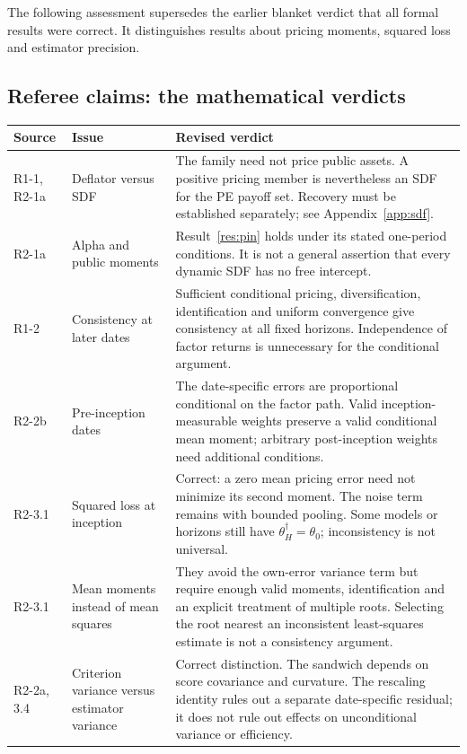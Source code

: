 \documentclass[11pt]{article}
\theoremstyle{plain}
\theoremstyle{definition}
\begin{document}
The following assessment supersedes the earlier blanket verdict that all formal results were correct. It distinguishes results about pricing moments, squared loss and estimator precision.

\subsection{Referee claims: the mathematical verdicts}

{\small
\begin{longtable}{@{}L{1.7cm}L{5.0cm}L{8.6cm}@{}}
\toprule
Source & Issue & Revised verdict\\
\midrule
\endhead
R1-1, R2-1a & Deflator versus SDF & The family need not price public assets. A positive pricing member is nevertheless an SDF for the PE payoff set. Recovery must be established separately; see Appendix~\ref{app:sdf}.\\
R2-1a & Alpha and public moments & Result~\ref{res:pin} holds under its stated one-period conditions. It is not a general assertion that every dynamic SDF has no free intercept.\\
R1-2 & Consistency at later dates & Sufficient conditional pricing, diversification, identification and uniform convergence give consistency at all fixed horizons. Independence of factor returns is unnecessary for the conditional argument.\\
R2-2b & Pre-inception dates & The date-specific errors are proportional conditional on the factor path. Valid inception-measurable weights preserve a valid conditional mean moment; arbitrary post-inception weights need additional conditions.\\
R2-3.1 & Squared loss at inception & Correct: a zero mean pricing error need not minimize its second moment. The noise term remains with bounded pooling. Some models or horizons still have $\theta_H^\dagger=\theta_0$; inconsistency is not universal.\\
R2-3.1 & Mean moments instead of mean squares & They avoid the own-error variance term but require enough valid moments, identification and an explicit treatment of multiple roots. Selecting the root nearest an inconsistent least-squares estimate is not a consistency argument.\\
R2-2a, 3.4 & Criterion variance versus estimator variance & Correct distinction. The sandwich depends on score covariance and curvature. The rescaling identity rules out a separate date-specific residual; it does not rule out effects on unconditional variance or efficiency.\\

\end{longtable}}
\end{document}

